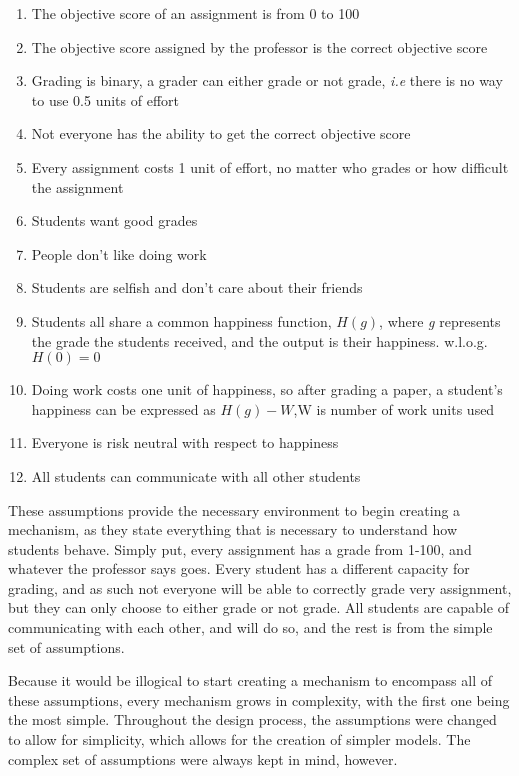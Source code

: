 \documentclass[12pt, Arial]{article}
\begin{document}
\begin{enumerate}
\item The objective score of an assignment is from 0 to 100
\item The objective score assigned by the professor is the correct objective score
\item Grading is binary, a grader can either grade or not grade, \emph{i.e} there is no way to use 0.5 units of effort
\item Not everyone has the ability to get the correct objective score
\item Every assignment costs 1 unit of effort, no matter who grades or how difficult the assignment
\item Students want good grades
\item People don't like doing work
\item Students are selfish and don't care about their friends
\item Students all share a common happiness function, $H(g)$, where \emph{g} represents the grade the students received, and the output is their happiness. w.l.o.g. $H(0)=0$
\item Doing work costs one unit of happiness, so after grading a paper, a student's happiness can be expressed as $H(g)-W$,W is number of work units used
\item Everyone is risk neutral with respect to happiness
\item All students can communicate with all other students
\end{enumerate}
These assumptions provide the necessary environment to begin creating a mechanism, as they state everything that is necessary to understand how students behave. Simply put, every assignment has a grade from 1-100, and whatever the professor says goes. Every student has a different capacity for grading, and as such not everyone will be able to correctly grade very assignment, but they can only choose to either grade or not grade. All students are capable of communicating with each other, and will do so, and the rest is from the simple set of assumptions.

Because it would be illogical to start creating a mechanism to encompass all of these assumptions, every mechanism grows in complexity, with the first one being the most simple. Throughout the design process, the assumptions were changed to allow for simplicity, which allows for the creation of simpler models. The complex set of assumptions were always kept in mind, however.
\end{document}
